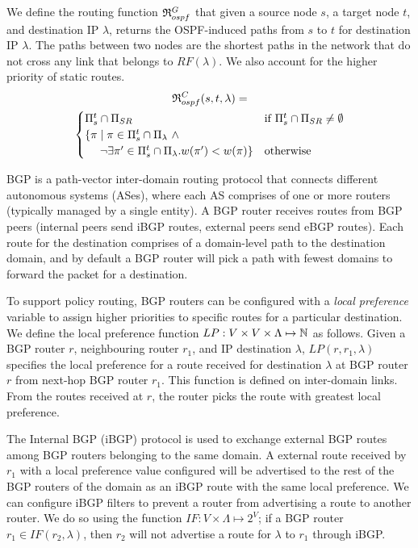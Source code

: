 We define the routing function 
$\mathfrak{R}_{ospf}^G$ 
that given 
a source node $s$,
a target node $t$,
and destination IP 
$\lambda$,
returns the OSPF-induced paths from $s$ to $t$ for destination IP $\lambda$.
The paths between two nodes are
the shortest paths in the network
that do not cross any link that belongs to $RF(\lambda)$. We also
account for the higher priority of static routes.
\begin{multline} \label{eq:ospfmodel}
\mathfrak{R}_{ospf}^C(s,t,\lambda) = \\
\begin{cases}
\text{$\Pi_s^t \cap \Pi_{SR}$}  & \text{if $\Pi_s^t \cap \Pi_{SR} \not=\emptyset$} \\
\text{$\{\pi \mid  \pi\in \Pi_s^t\cap \Pi_\lambda ~\wedge $} & \\
\text{~~~~$\neg\exists \pi'\in\Pi_s^t\cap \Pi_\lambda . w(\pi')< w(\pi)\}$} & \text{otherwise}
\end{cases}
\end{multline}

 BGP is a path-vector inter-domain routing protocol
that connects different autonomous systems (ASes), where each AS
comprises of one or more routers (typically managed by a single
entity). A BGP router receives routes from BGP peers (internal peers
send iBGP routes, external peers send eBGP routes). Each route for the
destination comprises of a domain-level path to the destination
domain, and by default a BGP router will pick a path with fewest domains 
to forward the packet for a destination.
 
To support policy routing, BGP routers can be configured with a
\emph{local preference} variable to assign higher priorities to
specific routes for a particular destination. We define the local
preference function $LP: V \times V \times \Lambda \mapsto \mathbb{N}$ as
follows.  Given a BGP router $r$, neighbouring router $r_1$, and IP
destination $\lambda$, $LP(r, r_1, \lambda)$ specifies the local
preference for a route received for destination $\lambda$ at BGP
router $r$ from next-hop BGP router $r_1$.  This function is defined
on inter-domain links.  From the routes received at $r$, the router
picks the route with greatest local preference.

The Internal BGP (iBGP) protocol is used to 
exchange external BGP routes 
among BGP routers belonging
to the same domain. A external route received 
by $r_1$ with a local preference value configured 
will be advertised to the rest of the BGP routers of the 
domain as an iBGP route with the same local
preference. We can configure iBGP 
filters to prevent a router from advertising 
a route to another router. We do so using the 
function $IF: V \times \Lambda \mapsto 2^V$;
if a BGP router $r_1 \in IF(r_2, \lambda)$, then
$r_2$ will not advertise a route for $\lambda$ to
$r_1$ through iBGP. 
 
